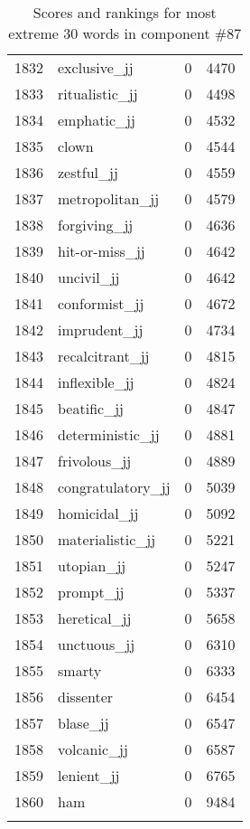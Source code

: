 \begin{longtable}[!htbp]{| rlr@{.}l |}
    1832 & exclusive\_jj & 0 & 4470 \\
    1833 & ritualistic\_jj & 0 & 4498 \\
    1834 & emphatic\_jj & 0 & 4532 \\
    1835 & clown & 0 & 4544 \\
    1836 & zestful\_jj & 0 & 4559 \\
    1837 & metropolitan\_jj & 0 & 4579 \\
    1838 & forgiving\_jj & 0 & 4636 \\
    1839 & hit-or-miss\_jj & 0 & 4642 \\
    1840 & uncivil\_jj & 0 & 4642 \\
    1841 & conformist\_jj & 0 & 4672 \\
    1842 & imprudent\_jj & 0 & 4734 \\
    1843 & recalcitrant\_jj & 0 & 4815 \\
    1844 & inflexible\_jj & 0 & 4824 \\
    1845 & beatific\_jj & 0 & 4847 \\
    1846 & deterministic\_jj & 0 & 4881 \\
    1847 & frivolous\_jj & 0 & 4889 \\
    1848 & congratulatory\_jj & 0 & 5039 \\
    1849 & homicidal\_jj & 0 & 5092 \\
    1850 & materialistic\_jj & 0 & 5221 \\
    1851 & utopian\_jj & 0 & 5247 \\
    1852 & prompt\_jj & 0 & 5337 \\
    1853 & heretical\_jj & 0 & 5658 \\
    1854 & unctuous\_jj & 0 & 6310 \\
    1855 & smarty & 0 & 6333 \\
    1856 & dissenter & 0 & 6454 \\
    1857 & blase\_jj & 0 & 6547 \\
    1858 & volcanic\_jj & 0 & 6587 \\
    1859 & lenient\_jj & 0 & 6765 \\
    1860 & ham & 0 & 9484 \\
    \hline
    \caption{Scores and rankings for most extreme 30 words in component \#87} \\
\end{longtable}
